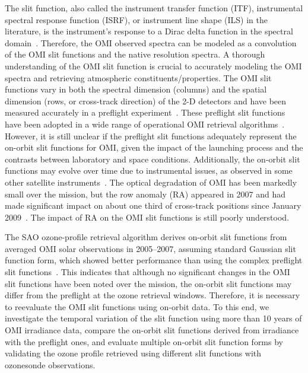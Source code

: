 \documentclass[amt,manuscript]{copernicus}
\begin{document}
The slit function, also called the instrument transfer function (ITF), instrumental spectral response function (ISRF), or instrument line shape (ILS) in the literature, is the instrument's response to a Dirac delta function in the spectral domain~\citep{dirksen2006prelaunch,Beirle2016parameterizing,sun2017}. Therefore, the OMI observed spectra can be modeled as a convolution of the OMI slit functions and the native resolution spectra. A thorough understanding of the OMI slit function is crucial to accurately modeling the OMI spectra and retrieving atmospheric constituents/properties. The OMI slit functions vary in both the spectral dimension (columns) and the spatial dimension (rows, or cross-track direction) of the 2-D detectors and have been measured accurately in a preflight experiment~\citep{dirksen2006prelaunch}. These preflight slit functions have been adopted in a wide range of operational OMI retrieval algorithms~\citep{kurosu2004preliminary,veefkind2006total,chan2014glyoxal,wang2014water,abad2015updated,geffen2015improved,li2017new}. However, it is still unclear if the preflight slit functions adequately represent the on-orbit slit functions for OMI, given the impact of the launching process and the contrasts between laboratory and space conditions. Additionally, the on-orbit slit functions may evolve over time due to instrumental issues, as observed in some other satellite instruments~\citep{desmedt2012improved,miles2015tropospheric,Beirle2016parameterizing,sun2017}. The optical degradation of OMI has been markedly small over the mission, but the row anomaly (RA) appeared in 2007 and had made significant impact on about one third of cross-track positions since January 2009~\citep{schenkeveld2016}. The impact of RA on the OMI slit functions is still poorly understood.

The SAO ozone-profile retrieval algorithm derives on-orbit slit functions from averaged OMI solar observations in 2005--2007, assuming standard Gaussian slit function form, which showed better performance than using the complex preflight slit functions~\citep{liu2010ozone}. This indicates that although no significant changes in the OMI slit functions have been noted over the mission, the on-orbit slit functions may differ from the preflight at the ozone retrieval windows. Therefore, it is necessary to reevaluate the OMI slit functions using on-orbit data. To this end, we investigate the temporal variation of the slit function using more than 10 years of OMI irradiance data, compare the on-orbit slit functions derived from irradiance with the preflight ones, and evaluate multiple on-orbit slit function forms by validating the ozone profile retrieved using different slit functions with ozonesonde observations.
\end{document}
